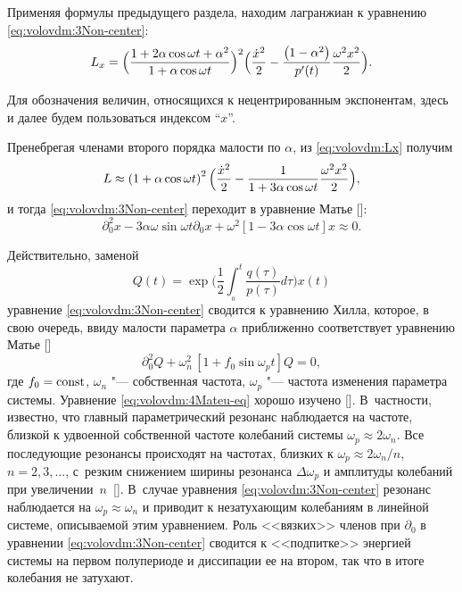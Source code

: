 Применяя формулы предыдущего раздела, находим лагранжиан к уравнению
\eqref{eq:volovdm:3Non-center}:
\begin{equation}
L_{x}=
\Bigl(\dfrac{1+2\alpha\cos\omega t+\alpha^{2}}{1+\alpha\cos\omega t}\Bigr)^{2}
\Bigl(\frac{\dot{x}^{2}}{2}-\frac{\left(1-\alpha^{2}\right)}{p^{\prime}(t)}\frac{\omega^{2}x^{2}}{2}\Bigr).
\label{eq:volovdm:Lx}
\end{equation}


Для обозначения величин, относящихся к нецентрированным экспонентам,
здесь и далее будем пользоваться индексом ``$x$''.

Пренебрегая членами второго порядка малости по $\alpha$, из \eqref{eq:volovdm:Lx}
получим
\[
L\approx\left(1+\alpha\cos\omega t\right)^{2}\Bigl(\frac{\dot{x}^{2}}{2}-\frac{1}{1+3\alpha\cos\omega t}\frac{\omega^{2}x^{2}}{2}\Bigr),
\]
и тогда \eqref{eq:volovdm:3Non-center} переходит в уравнение Матье {[]}: %
\[
\partial_{0}^{2}x-3\alpha\omega\sin\omega t \partial_{0}x+\omega^{2}\left[1-3\alpha\cos\omega t\right] x\approx0.
\]


Действительно, заменой 
$$Q(t)=\exp\biggl(\frac{1}{2}\int_{_{0}}^{t}\frac{q(\tau)}{p(\tau)}d\tau\biggr) x(t)$$
уравнение \eqref{eq:volovdm:3Non-center}
сводится к уравнению Хилла, которое, в свою очередь, ввиду малости
параметра $\alpha$ приближенно соответствует уравнению Матье {[]}
\begin{equation}
\partial_{0}^{2}Q+\omega_{n}^{2}\,\left[1+f_{0}\sin\omega_{p}t\right]Q=0,\label{eq:volovdm:4Mateu-eq}
\end{equation}
где $f_{0}=\rm const$, $\omega_{n}$ "--- собственная частота, $\omega_{p}$ "--- частота изменения параметра системы. Уравнение \eqref{eq:volovdm:4Mateu-eq} хорошо изучено {[]}. 
В~частности, известно, что главный параметрический резонанс наблюдается на частоте, близкой к удвоенной собственной частоте колебаний системы $\omega_{p}\approx2\omega_{n}$.
Все последующие резонансы происходят на частотах, близких к 
$\omega_{p}\approx {2\omega_{n}}/{n}$, $n=2, 3, \dots$,
с~резким снижением ширины резонанса $\Delta\omega_{p}$ и амплитуды
колебаний при увеличении~$n$~{[]}. 
В~случае уравнения \eqref{eq:volovdm:3Non-center}
резонанс наблюдается на $\omega_{p}\approx\omega_{n}$ и приводит
к незатухающим колебаниям в линейной системе, описываемой этим уравнением. 
Роль <<вязких>>
членов при $\partial_{0}$ в уравнении \eqref{eq:volovdm:3Non-center} сводится 
к <<подпитке>> энергией системы на первом полупериоде и диссипации ее на втором, так что в итоге колебания не затухают. 

